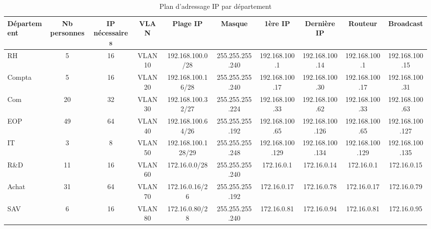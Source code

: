 \documentclass{article}
\begin{document}
\begin{table}[H]
\centering
\begin{tabular}{|l|c|c|c|c|c|c|c|c|c|}
\hline
Département & Nb personnes & IP nécessaires & VLAN & Plage IP & Masque & 1ère IP & Dernière IP & Routeur & Broadcast \\
\hline
RH     & 5  & 16 & VLAN 10 & 192.168.100.0/28   & 255.255.255.240 & 192.168.100.1  & 192.168.100.14  & 192.168.100.1  & 192.168.100.15 \\
Compta & 5  & 16 & VLAN 20 & 192.168.100.16/28  & 255.255.255.240 & 192.168.100.17 & 192.168.100.30  & 192.168.100.17 & 192.168.100.31 \\
Com    & 20 & 32 & VLAN 30 & 192.168.100.32/27  & 255.255.255.224 & 192.168.100.33 & 192.168.100.62  & 192.168.100.33 & 192.168.100.63 \\
EOP    & 49 & 64 & VLAN 40 & 192.168.100.64/26  & 255.255.255.192 & 192.168.100.65 & 192.168.100.126 & 192.168.100.65 & 192.168.100.127 \\
IT     & 3  & 8  & VLAN 50 & 192.168.100.128/29 & 255.255.255.248 & 192.168.100.129 & 192.168.100.134 & 192.168.100.129 & 192.168.100.135 \\
R\&D   & 11 & 16 & VLAN 60 & 172.16.0.0/28      & 255.255.255.240 & 172.16.0.1     & 172.16.0.14     & 172.16.0.1     & 172.16.0.15 \\
Achat  & 31 & 64 & VLAN 70 & 172.16.0.16/26     & 255.255.255.192 & 172.16.0.17    & 172.16.0.78     & 172.16.0.17    & 172.16.0.79 \\
SAV    & 6  & 16 & VLAN 80 & 172.16.0.80/28     & 255.255.255.240 & 172.16.0.81    & 172.16.0.94     & 172.16.0.81    & 172.16.0.95 \\
\hline
\end{tabular}
\caption{Plan d'adressage IP par département}
\end{table}
\end{document}
